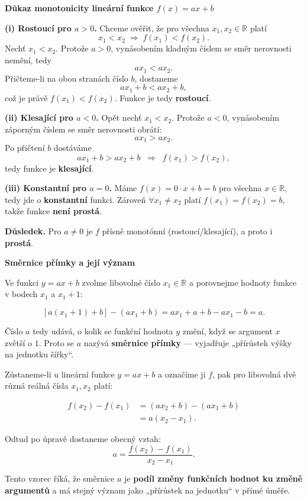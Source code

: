 \documentclass[12pt,a4paper]{article}
\begin{document}
\begin{notebox}
\textbf{Důkaz monotonicity lineární funkce \(f(x)=ax+b\)}

\textbf{(i) Rostoucí pro \(a>0\).}  
Chceme ověřit, že pro všechna \(x_1,x_2\in\mathbb{R}\) platí
\[
x_1<x_2 \;\Rightarrow\; f(x_1)<f(x_2).
\]
Nechť \(x_1<x_2\). Protože \(a>0\), vynásobením kladným číslem se směr nerovnosti nemění, tedy
\[
a x_1 < a x_2.
\]
Přičteme-li na obou stranách číslo \(b\), dostaneme
\[
a x_1 + b < a x_2 + b,
\]
což je právě \(f(x_1) < f(x_2)\). Funkce je tedy \textbf{rostoucí}.

\medskip
\textbf{(ii) Klesající pro \(a<0\).}  
Opět nechť \(x_1<x_2\). Protože \(a<0\), vynásobením záporným číslem se směr nerovnosti obrátí:
\[
a x_1 > a x_2.
\]
Po přičtení \(b\) dostáváme
\[
a x_1 + b > a x_2 + b \;\;\Rightarrow\;\; f(x_1)>f(x_2),
\]
tedy funkce je \textbf{klesající}.

\medskip
\textbf{(iii) Konstantní pro \(a=0\).}  
Máme \(f(x)=0\cdot x + b = b\) pro všechna \(x\in\mathbb{R}\), tedy jde o \textbf{konstantní} funkci.  
Zároveň \(\forall x_1\neq x_2\) platí \(f(x_1)=f(x_2)=b\), takže funkce \textbf{není prostá}.

\medskip
\textbf{Důsledek.} Pro \(a\neq 0\) je \(f\) přísně monotónní (rostoucí/klesající), a proto i \textbf{prostá}.
\end{notebox}



\begin{examplebox}
\textbf{Směrnice přímky a její význam}

Ve funkci \(y = ax + b\) zvolme libovolné číslo \(x_1 \in \mathbb{R}\) a porovnejme hodnoty funkce v bodech \(x_1\) a \(x_1 + 1\):

\[
[a(x_1 + 1) + b] - (a x_1 + b) = a x_1 + a + b - a x_1 - b = a.
\]

Číslo \(a\) tedy udává, o kolik se funkční hodnota \(y\) změní, když se argument \(x\) zvětší o \(1\).  
Proto se \(a\) nazývá \textbf{směrnice přímky} — vyjadřuje „přírůstek výšky na jednotku šířky“.

\medskip
Zůstaneme-li u lineární funkce \(y = ax + b\) a označíme ji \(f\), pak pro libovolná dvě různá reálná čísla \(x_1, x_2\) platí:

\[
\begin{aligned}
f(x_2) - f(x_1) &= (a x_2 + b) - (a x_1 + b) \\[4pt]
&= a(x_2 - x_1).
\end{aligned}
\]

Odtud po úpravě dostaneme obecný vztah:
\[
\boxed{a = \frac{f(x_2) - f(x_1)}{x_2 - x_1}}.
\]

Tento vzorec říká, že směrnice \(a\) je \textbf{podíl změny funkčních hodnot ku změně argumentů}  
a má stejný význam jako „přírůstek na jednotku“ v přímé úměře.
\end{examplebox}
\end{document}
